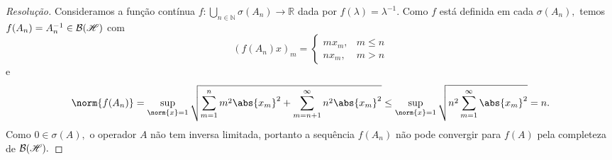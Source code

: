 \begin{proof}[Resolução]
  Consideramos a função contínua \(f : \bigcup_{n\in\mathbb{N}}\sigma(A_n) \to \mathbb{R}\) dada por \(f(\lambda) = \lambda^{-1}.\) Como \(f\) está definida em cada \(\sigma(A_n),\) temos \(f(A_n) = A_n^{-1} \in \mathcal{B}(\mathscr{H})\) com
  \begin{equation*}
    (f(A_n)x)_m = \begin{cases}
      mx_m,&m \leq n\\
      nx_m,&m > n
    \end{cases}
  \end{equation*}
  e
  \begin{equation*}
    \norm{f(A_n)} = \sup_{\norm{x} = 1}\sqrt{\sum_{m = 1}^n m^2 \abs{x_m}^2 + \sum_{m = n+1}^\infty n^2 \abs{x_m}^2} \leq \sup_{\norm{x}=1}{\sqrt{n^2\sum_{m = 1}^\infty\abs{x_m}^2}} = n.
  \end{equation*}
  Como \(0 \in \sigma(A),\) o operador \(A\) não tem inversa limitada, portanto a sequência \(f(A_n)\) não pode convergir para \(f(A)\) pela completeza de \(\mathcal{B}(\mathscr{H}).\)
\end{proof}
